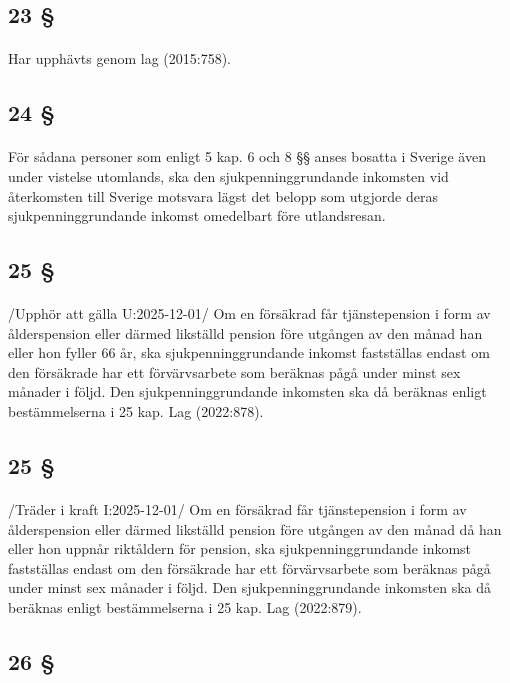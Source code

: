 \documentclass[a4paper,notitlepage,openany,10pt]{book}
\begin{document}
\subsection*{23 §}
\paragraph*{}
Har upphävts genom
lag (2015:758).
\subsection*{24 §}
\paragraph*{}
För sådana personer som enligt 5 kap. 6 och 8 §§ anses bosatta i Sverige även under vistelse utomlands, ska den sjukpenninggrundande inkomsten vid återkomsten till Sverige motsvara lägst det belopp som utgjorde deras sjukpenninggrundande inkomst omedelbart före utlandsresan.
\subsection*{25 §}
\paragraph*{}
/Upphör att gälla U:2025-12-01/
Om en försäkrad får tjänstepension i form av ålderspension eller därmed likställd pension före utgången av den månad han eller hon fyller 66 år, ska sjukpenninggrundande inkomst fastställas endast om den försäkrade har ett förvärvsarbete som beräknas pågå under minst sex månader i följd. Den sjukpenninggrundande inkomsten ska då beräknas enligt bestämmelserna i 25 kap.
Lag (2022:878).
\subsection*{25 §}
\paragraph*{}
/Träder i kraft I:2025-12-01/
Om en försäkrad får tjänstepension i form av ålderspension eller därmed likställd pension före utgången av den månad då han eller hon uppnår riktåldern för pension, ska sjukpenninggrundande inkomst fastställas endast om den försäkrade har ett förvärvsarbete som beräknas pågå under minst sex månader i följd. Den sjukpenninggrundande inkomsten ska då beräknas enligt bestämmelserna i 25 kap.
Lag (2022:879).
\subsection*{26 §}
\end{document}
